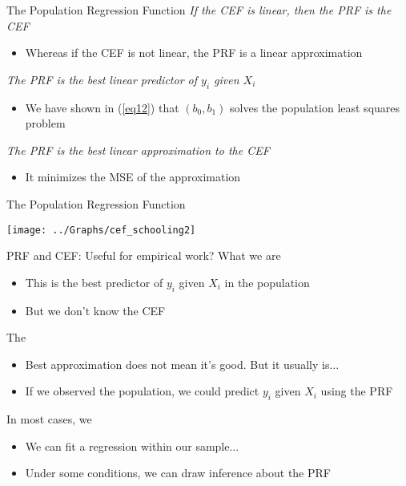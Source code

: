 \begin{frame}{The Population Regression Function}
\vfill
{} \textit{If the CEF is linear, then the PRF is the CEF}
\begin{itemize}
\item Whereas if the CEF is not linear, the PRF is a linear approximation
\end{itemize}
\vfill
\pause
{} \textit{The PRF is the best linear predictor of $y_i$ given $X_i$}
\begin{itemize}
\item We have shown in (\ref{eq12}) that $(b_0, b_1)$ solves the population least squares problem
\end{itemize}
\vfill
\pause 
{} \textit{The PRF is the best linear approximation to the CEF}
\begin{itemize}
\item It minimizes the MSE of the approximation
\end{itemize}
\end{frame}


\begin{frame}{The Population Regression Function}
\begin{center}
\texttt{[image: ../Graphs/cef\_schooling2]}
\end{center}
\end{frame}


\begin{frame}{PRF and CEF: Useful for empirical work? }
What we are 
\begin{itemize}
\item This is the best predictor of $y_i$ given $X_i$ in the population 
\item But we don't know the CEF
\end{itemize}
\vfill
\pause
The 
\begin{itemize}
\item Best approximation does not mean it's good. But it usually is...
\item If we observed the population, we could predict $y_i$ given $X_i$ using the PRF
\end{itemize}
\vfill
\pause
In most cases, we 
\begin{itemize}
\item We can fit a regression within our sample...
\item Under some conditions, we can draw inference about the PRF
\end{itemize}

\end{frame}


